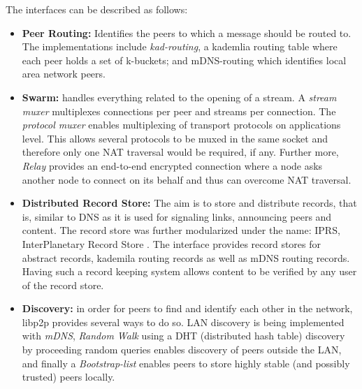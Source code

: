\documentclass[conference]{IEEEtran}
\begin{document}
The interfaces can be described as follows:
\begin{itemize}
\item \textbf{Peer Routing:} Identifies the peers to which a message should be routed to.
The implementations include \textit{kad-routing}, a kademlia routing table where each peer holds a set of k-buckets; and mDNS-routing which identifies local area network peers.
\item \textbf{Swarm:} handles everything related to the opening of a stream.
A \textit{stream muxer} multiplexes connections per peer and streams per connection.
The \textit{protocol muxer} enables multiplexing of transport protocols on applications level.
This allows several protocols to be muxed in the same socket and therefore only one NAT traversal would be required, if any.
Further more, \textit{Relay} provides an end-to-end encrypted connection where a node asks another node to connect on its behalf and thus can overcome NAT traversal.
\item \textbf{Distributed Record Store:} The aim is to store and distribute records, that is, similar to DNS as it is used for signaling links, announcing peers and content.
The record store was further modularized under the name: IPRS, InterPlanetary Record Store \cite{iprs}.
The interface provides record stores for abstract records, kademila routing records as well as mDNS routing records. 
Having such a record keeping system allows content to be verified by any user of the record store.
\item \textbf{Discovery:} in order for peers to find and identify each other in the network, libp2p provides several ways to do so.
LAN discovery is being implemented with \textit{mDNS}, \textit{Random Walk} using a DHT (distributed hash table) discovery by proceeding random queries enables discovery of peers outside the LAN, and finally a \textit{Bootstrap-list} enables peers to store highly stable (and possibly trusted) peers locally.

\end{itemize}
\end{document}
